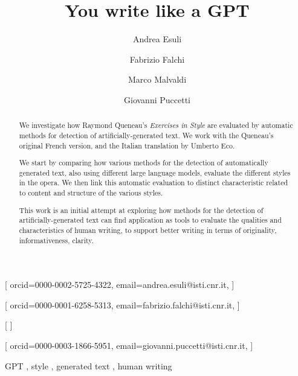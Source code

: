 \documentclass[
twocolumn,
]{ceurart}
\begin{document}


\title{You write like a GPT}

\author[1]{Andrea Esuli}[%
orcid=0000-0002-5725-4322,
email=andrea.esuli@isti.cnr.it,
]
\author[1]{Fabrizio Falchi}[%
orcid=0000-0001-6258-5313,
email=fabrizio.falchi@isti.cnr.it,
]
\author[1,2]{Marco Malvaldi}[%
]
\author[1]{Giovanni Puccetti}[%
orcid=0000-0003-1866-5951,
email=giovanni.puccetti@isti.cnr.it,
]

\fnmark[1]

\address[1]{Istituto di Scienza e Tecnologie dell'Informazione ``A. Faedo''- Consiglio Nazionale delle Ricerche}
\address[2]{Professional writer}



\begin{abstract}
We investigate how Raymond Queneau's \textit{Exercises in Style} are evaluated by automatic methods for detection of artificially-generated text.
We work with the Queneau's original French version, and the Italian translation by Umberto Eco.

We start by comparing how various methods for the detection of automatically generated text, also using different large language models, evaluate the different styles in the opera.
We then link this automatic evaluation to distinct characteristic related to content and structure of the various styles.

This work is an initial attempt at exploring how methods for the detection of artificially-generated text can find application as tools to evaluate the qualities and characteristics of human writing, to support better writing in terms of originality, informativeness, clarity.
\end{abstract}


\begin{keywords}
GPT \sep
style \sep
generated text \sep
human writing
\end{keywords}

\end{document}
